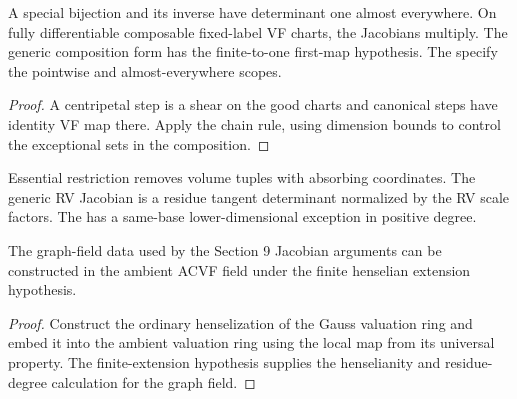 \begin{lemma}
\label{lem:vf-jacobian-rules}
\leanok
A special bijection and its inverse have determinant one almost
everywhere. On fully differentiable composable fixed-label VF charts,
the Jacobians multiply. The generic composition form has the
finite-to-one first-map hypothesis. The
 specify the
pointwise and almost-everywhere scopes.
\end{lemma}
\begin{proof}
\leanok
{}
A centripetal step is a shear on the good charts and canonical
steps have identity VF map there. Apply the chain rule, using
dimension bounds to control the exceptional sets in the composition.
\end{proof}

\begin{definition}
\label{def:rv-jacobian}
\leanok
Essential restriction removes volume tuples with absorbing
coordinates. The generic RV Jacobian is a residue tangent
determinant normalized by the RV scale factors. The
has a same-base lower-dimensional exception in positive degree.
\end{definition}

\begin{proposition}
\label{prop:henselized-graph-field}
\leanok
The graph-field data used by the Section 9 Jacobian arguments can be
constructed in the ambient ACVF field under the finite henselian
extension hypothesis.
\end{proposition}
\begin{proof}
\leanok
{}
Construct the ordinary henselization of the Gauss valuation ring
and embed it into the ambient valuation ring using the local map
from its universal property. The finite-extension hypothesis supplies
the henselianity and residue-degree calculation for the graph field.
\end{proof}

